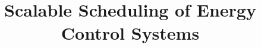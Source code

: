 \documentclass{sig-alternate}
\begin{document}
%

\title{Scalable Scheduling of Energy Control Systems} %
%
%
%
%
%
\end{document}
